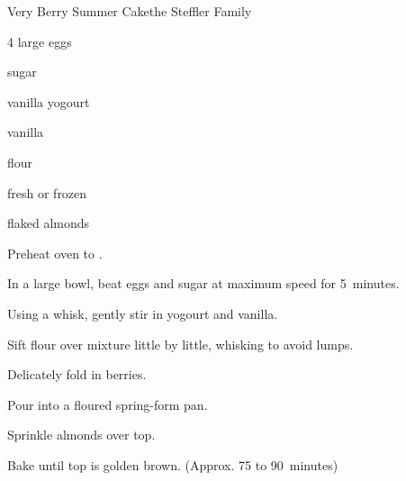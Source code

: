 \begin{recipe}{Very Berry Summer Cake}{the Steffler Family}{}

\begin{ingredients}
\item 4 large eggs
\item \C{\threequarter} sugar
\item {} vanilla yogourt
\item {} vanilla
\item \C{1\quarter} flour
\item {} fresh or frozen 
\item \C{\quarter} flaked almonds
\end{ingredients}

\begin{directions}
\item Preheat oven to .
\item In a large bowl, beat eggs and sugar at maximum speed for 5~minutes.
\item Using a whisk, gently stir in yogourt and vanilla.
\item Sift flour over mixture little by little, whisking to avoid lumps.
\item Delicately fold in berries.
\item Pour into a floured spring-form pan.
\item Sprinkle almonds over top.
\item Bake until top is golden brown. (Approx. 75 to 90~minutes)
\end{directions}
\end{recipe}
